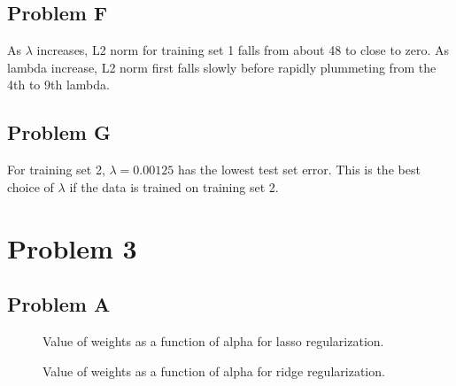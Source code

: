 \documentclass[12pt]{article} %
\begin{document}
\subsection{Problem F}
As $\lambda$ increases, L2 norm for training set 1 falls from about 48 to close to zero. As lambda increase, L2 norm first falls slowly before rapidly plummeting from the 4th to 9th lambda.

\subsection{Problem G}
For training set 2, $\lambda = 0.00125$ has the lowest test set error. This is the best choice of $\lambda$ if the data is trained on training set 2.

\section{Problem 3}

\subsection{Problem A}

\begin{figure}[H]
	\vspace{-10mm}
	\caption{Value of weights as a function of alpha for lasso regularization.}
\end{figure}


\begin{figure}[H]
	\vspace{-10mm}
	\caption{Value of weights as a function of alpha for ridge regularization.}
\end{figure}
\end{document}
